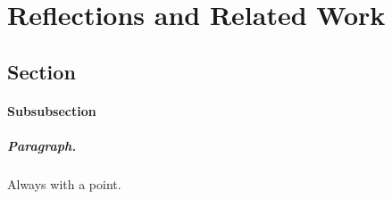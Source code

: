 \chapter{Reflections and Related Work}
\label{chap:reflection}
\section{Section}
\subsubsection{Subsubsection}

\paragraph{Paragraph.} Always with a point.

